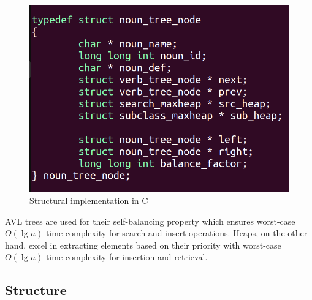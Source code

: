\documentclass[conference]{IEEEtran}
\begin{document}
\begin{figure}[htbp]
\centering
\includegraphics[width=0.8\linewidth]{c1.png} %
\caption{Structural implementation in C}
\label{fig}
\end{figure}

AVL trees are used for their self-balancing property which ensures worst-case $O(\lg n)$ time complexity for search and insert operations.
Heaps, on the other hand, excel in extracting elements based on their priority with worst-case $O(\lg n)$ time complexity for insertion and retrieval. 


\subsection{Structure}
\end{document}
